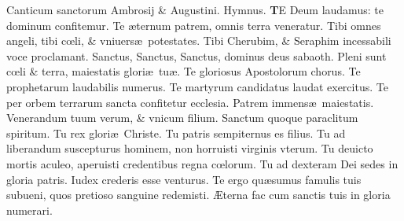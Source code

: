 \documentclass[a5paper,10pt]{book}
\def\ae{æ}
\def\AE{Æ}
\def\oe{œ}
\begin{document}
\begin{multicols*}{2}
\newline {} \color{red} Canticum sanctorum Ambrosij \& Augustini. Hymnus. \color{black}
\vspace{-1em}
\lettrine[lines=2]{\bfseries \color{red} T}{}E Deum laudamus: te dominum confitemur.
\newline \color{red} T\color{black}e \ae ternum patrem, omnis terra veneratur.
\newline \color{red} T\color{black}ibi omnes angeli, tibi c\oe li, \& vniuers\ae \ potestates.
\newline \color{red} T\color{black}ibi Cherubim, \& Seraphim incessabili voce proclamant.
\newline \color{red} S\color{black}anctus, Sanctus, Sanctus, dominus deus sabaoth.
\newline \color{red} P\color{black}leni sunt c\oe li \& terra, maiestatis glori\ae \ tu\ae .
\newline \color{red} T\color{black}e gloriosus Apostolorum chorus.
\newline \color{red} T\color{black}e prophetarum laudabilis numerus.
\newline \color{red} T\color{black}e martyrum candidatus laudat exercitus.
\newline \color{red} T\color{black}e per orbem terrarum sancta confitetur ecclesia.
\newline \color{red} P\color{black}atrem immens\ae \ maiestatis.
\newline \color{red} V\color{black}enerandum tuum verum, \& vnicum filium.
\newline \color{red} S\color{black}anctum quoque paraclitum spiritum.
\newline \color{red} T\color{black}u rex glori\ae \ Christe.
\newline \color{red} T\color{black}u patris sempiternus es filius.
\newline \color{red} T\color{black}u ad liberandum suscepturus hominem, non horruisti virginis vterum.
\newline \color{red} T\color{black}u deuicto mortis aculeo, aperuisti credentibus regna c\oe lorum.
\newline \color{red} T\color{black}u ad dexteram Dei sedes in gloria patris.
\newline \color{red} I\color{black}udex crederis esse venturus.
\newline \color{red} T\color{black}e ergo qu\ae sumus famulis tuis subueni, quos pretioso sanguine redemisti.
\newline \color{red} \AE \color{black}terna fac cum sanctis tuis in gloria numerari.

\end{multicols*}
\end{document}
